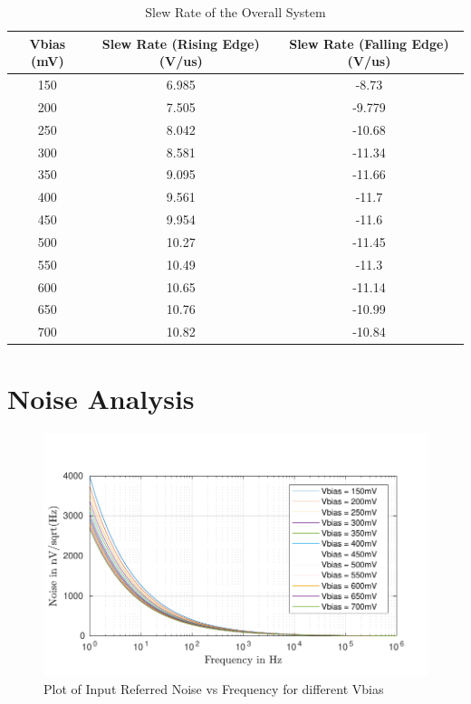 \begin{table} [H]
\centering
\begin{tabular}{@{}ccc@{}}
\toprule
Vbias (mV)			& Slew Rate (Rising Edge)(V/us)			& Slew Rate (Falling Edge)(V/us)	 \\ \midrule
150					& 6.985	 					& -8.73					 \\
200					& 7.505 					& -9.779				 \\
250					& 8.042 					& -10.68				 \\
300					& 8.581 					& -11.34				 \\
350					& 9.095						& -11.66				 \\
400					& 9.561						& -11.7					 \\
450					& 9.954 					& -11.6					 \\
500					& 10.27						& -11.45				 \\
550					& 10.49	 					& -11.3					 \\
600					& 10.65 					& -11.14				 \\
650					& 10.76 					& -10.99				 \\
700 				& 10.82 					& -10.84				 \\
\bottomrule
\end{tabular}
\caption{Slew Rate of the Overall System}
\end{table}

\section{Noise Analysis}

\begin{figure} [H]
\centering
\includegraphics[scale=1]{Figures/Plots/Ov_Noise.pdf}
\caption{Plot of Input Referred Noise vs Frequency for different Vbias}
\end{figure}

